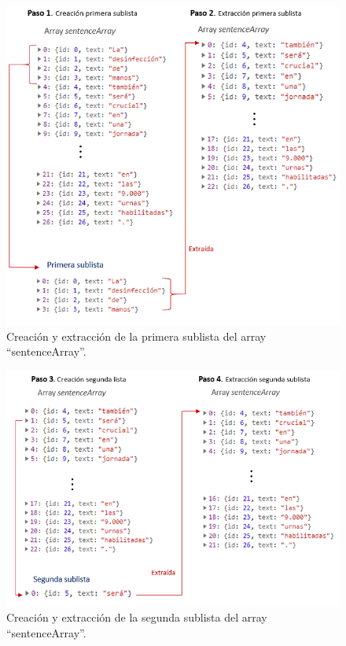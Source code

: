 \begin{itemize}
\begin{itemize}
\begin{figure}[h!]
			
			\includegraphics[scale=1.2]{Imagenes/Figuras/IntercambioPaso1_y_2}
			
			
			\caption{Creación y extracción de la primera sublista del array ``sentenceArray''.}
			\label{fig:paso1y2}
		\end{figure}
		\begin{figure}[h!]
		\centering
		
		
		\includegraphics[scale=1.1]{Imagenes/Figuras/IntercambioPaso3_y_4}
		
		
		\caption{Creación y extracción de la segunda sublista del array ``sentenceArray''.}
		\label{fig:paso3y4}
	\end{figure}
	\begin{figure}[h!]
	\centering
	

\end{figure}
\end{itemize}
\end{itemize}
